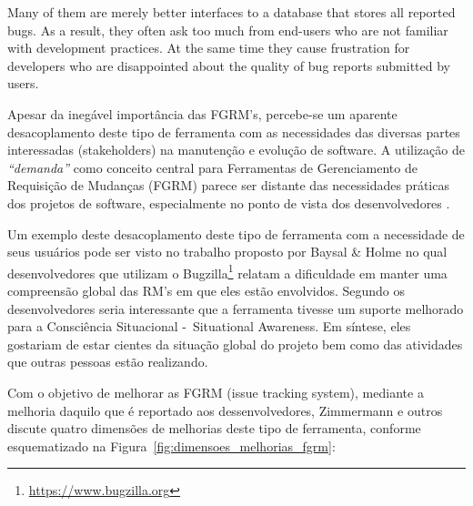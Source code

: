 Many
of them are merely better interfaces to a database that stores
all reported bugs. As a result, they often ask too much from
end-users who are not familiar with development practices.
At the same time they cause frustration for developers who
are disappointed about the quality of bug reports submitted
by users.

Apesar da inegável importância das FGRM's, percebe-se um aparente desacoplamento deste tipo de
ferramenta com as necessidades das diversas partes interessadas (stakeholders) na manutenção e
evolução de software. A utilização de  \textit{``demanda''} como conceito central para Ferramentas de Gerenciamento de
Requisição de Mudanças (FGRM) parece ser distante das necessidades práticas dos projetos de
software, especialmente no ponto de vista dos desenvolvedores
\cite{Baysal:2013:SAP:2486788.2486957}.

Um exemplo deste desacoplamento deste tipo de ferramenta com a necessidade de seus usuários pode ser visto no
trabalho proposto por Baysal \& Holme \cite{baysal2012qualitative} no qual desenvolvedores que
utilizam o Bugzilla\footnote{\url{https://www.bugzilla.org}} relatam a dificuldade em manter uma
compreensão global das RM's em que eles estão envolvidos. Segundo os desenvolvedores seria
interessante que a ferramenta tivesse um suporte melhorado para a Consciência Situacional
-~Situational Awareness. Em síntese, eles gostariam de estar cientes da situação global do projeto
bem como das atividades que outras pessoas estão realizando.

Com o objetivo de melhorar as FGRM (issue tracking system), mediante a melhoria daquilo que é
reportado aos dessenvolvedores, Zimmermann e outros discute quatro dimensões de melhorias deste tipo
de ferramenta, conforme esquematizado na Figura~\ref{fig:dimensoes_melhorias_fgrm}:

